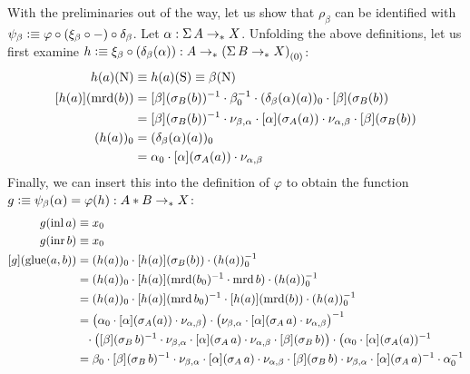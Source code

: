 \documentclass[english,a4paper]{lmcs}
\begin{document}
With the preliminaries out of the way, let us show that $\rho_\beta$ can be
identified with $\psi_\beta \vcentcolon\equiv \varphi \circ (\xi_\beta \circ \mathord{{-}})
\circ \delta_\beta$. Let $\alpha : \operatorname{\Sigma} A \to_\ast X$.
%
Unfolding the above definitions, let us first examine
$h \vcentcolon\equiv \xi_\beta\circ (\delta_\beta(\alpha)) : A \to_\ast {(\operatorname{\Sigma}B\to_\ast X)}_{\left(0\right)}$:
\begin{align*}
  h(a)(\mathrm{N}) &\equiv h(a)(\mathrm{S}) \equiv \beta(\mathrm{N}) \\
  \mathop{\left[{h(a)}\right]}(\operatorname{\mathrm{mrd}}(b))
  &= \mathop{\left[{\beta}\right]}(\sigma_B(b))^{-1}
     \cdot \beta_0^{-1}
     \cdot (\delta_\beta(\alpha)(a))_0
     \cdot \mathop{\left[{\beta}\right]}(\sigma_B(b)) \\
   &= \mathop{\left[{\beta}\right]}(\sigma_B(b))^{-1}
     \cdot \nu_{\beta,\alpha}
     \cdot \mathop{\left[{\alpha}\right]}(\sigma_A(a))
     \cdot \nu_{\alpha,\beta}
     \cdot \mathop{\left[{\beta}\right]}(\sigma_B(b)) \\
  (h(a))_0
  &= (\delta_\beta(\alpha)(a))_0 \\
  &= \alpha_0 \cdot \mathop{\left[{\alpha}\right]}(\sigma_A(a))
           \cdot \nu_{\alpha,\beta}
\end{align*}
Finally, we can insert this into the definition of $\varphi$
to obtain the function $g \vcentcolon\equiv \psi_\beta(\alpha) = \varphi(h) : A * B \to_\ast X$:
\begin{align*}
  g(\mathop{\mathrm{inl}} a)
  &\equiv x_0 \\
  g(\mathop{\mathrm{inr}} b)
  &\equiv x_0 \\
  \mathop{\left[{g}\right]}(\operatorname{\mathrm{glue}}(a,b))
  &= (h(a))_0 \cdot \mathop{\left[{h(a)}\right]}(\sigma_B(b)) \cdot (h(a))_0^{-1} \\
  &= (h(a))_0 \cdot \mathop{\left[{h(a)}\right]}(\operatorname{\mathrm{mrd}}(b_0)^{-1} \cdot\operatorname{\mathrm{mrd}} b)
    \cdot (h(a))_0^{-1} \\
  &= (h(a))_0 \cdot \mathop{\left[{h(a)}\right]}(\operatorname{\mathrm{mrd}}{b_0})^{-1}
    \cdot \mathop{\left[{h(a)}\right]}(\operatorname{\mathrm{mrd}} (b)) \cdot (h(a))_0^{-1} \\
  &= \bigl(\alpha_0 \cdot \mathop{\left[{\alpha}\right]}(\sigma_A(a))
    \cdot \nu_{\alpha,\beta}\bigr)
    \cdot \bigl(\nu_{\beta,\alpha}
    \cdot \mathop{\left[{\alpha}\right]}(\sigma_A\,a)
    \cdot \nu_{\alpha,\beta}\bigr)^{-1} \\
  &\phantom{=} \cdot
    \bigl(\mathop{\left[{\beta}\right]}(\sigma_B\,b)^{-1}
    \cdot \nu_{\beta,\alpha}
    \cdot \mathop{\left[{\alpha}\right]}(\sigma_A\,a)
    \cdot \nu_{\alpha,\beta}
    \cdot \mathop{\left[{\beta}\right]}(\sigma_B\,b)\bigr)
    \cdot \bigl(\alpha_0 \cdot \mathop{\left[{\alpha}\right]}(\sigma_A(a))^{-1} \\
  &= \beta_0
    \cdot \mathop{\left[{\beta}\right]}(\sigma_B\,b)^{-1}
    \cdot \nu_{\beta,\alpha}
    \cdot \mathop{\left[{\alpha}\right]}(\sigma_A\,a)
    \cdot \nu_{\alpha,\beta}
    \cdot \mathop{\left[{\beta}\right]}(\sigma_B\,b)
    \cdot \nu_{\beta,\alpha}
    \cdot \mathop{\left[{\alpha}\right]}(\sigma_A\,a)^{-1}
    \cdot \alpha_0^{-1}
\end{align*}
\end{document}
